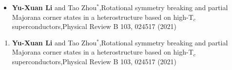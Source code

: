 \newpage
{}

\begin{itemize}
	\item {\bf Yu-Xuan Li} and Tao Zhou$^{*}$,Rotational symmetry breaking and partial Majorana corner states in a heterostructure
	based on high-T$_c$ superconductors,Physical Review B 103, 024517 (2021)
\end{itemize}

\begin{enumerate}
	\item {\bf Yu-Xuan Li} and Tao Zhou$^{*}$,Rotational symmetry breaking and partial Majorana corner states in a heterostructure
	based on high-T$_c$ superconductors,Physical Review B 103, 024517 (2021)
\end{enumerate}